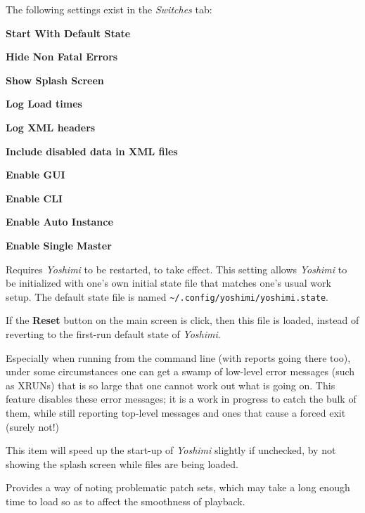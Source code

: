    The following settings exist in the \textsl{Switches} tab:

   \begin{enumber}
      \item \textbf{Start With Default State}
      \item \textbf{Hide Non Fatal Errors}
      \item \textbf{Show Splash Screen}
      \item \textbf{Log Load times}
      \item \textbf{Log XML headers}
      \item \textbf{Include disabled data in XML files}
      \item \textbf{Enable GUI}
      \item \textbf{Enable CLI}
      \item \textbf{Enable Auto Instance}
      \item \textbf{Enable Single Master}
   \end{enumber}

   \setcounter{ItemCounter}{0}      %

   Requires \textsl{Yoshimi} to be restarted, to take effect.
   This setting allows \textsl{Yoshimi} to be initialized with one's own
   initial state file that matches one's usual work setup.
   The default state file is named
   \texttt{\textasciitilde/.config/yoshimi/yoshimi.state}.

   If the \textbf{Reset} button on the main screen is click, then this file is
   loaded, instead of reverting to the first-run default state of
   \textsl{Yoshimi}.

   Especially when running from the command line (with reports going there
   too), under some circumstances one can get a swamp of low-level error
   messages (such as XRUNs) that is so large that one cannot work out what is
   going on. This feature disables these error messages; it is a work in
   progress to catch the bulk of them, while still reporting top-level messages
   and ones that cause a forced exit (surely not!)

   This item will speed up the start-up of \textsl{Yoshimi} slightly
   if unchecked, by not showing the splash screen while files are being loaded.

   Provides a way of noting problematic patch sets, which may take a long
   enough time to load so as to affect the smoothness of playback.

